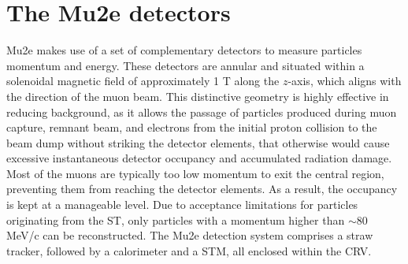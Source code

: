 \section{The Mu2e detectors}
Mu2e makes use of a set of complementary detectors to 
measure particles momentum and energy. These detectors 
are annular and situated within a solenoidal magnetic field of 
approximately 1 T along the $z$-axis, which aligns with 
the direction of the muon beam. This distinctive geometry 
is highly effective in reducing background, as it allows 
the passage of particles produced during muon capture, 
remnant beam, and electrons from the initial proton collision to the beam dump without striking
the detector elements, that otherwise would cause excessive instantaneous detector 
occupancy and accumulated radiation damage. 
Most of the muons are typically too low momentum 
to exit the central region, preventing them from reaching the detector elements. 
As a result, the occupancy is kept at a manageable level. 
Due to acceptance limitations for particles originating from the ST, 
only particles with a momentum higher than $\sim$80 MeV/c can be reconstructed.
The Mu2e detection system comprises a straw tracker, followed by a 
calorimeter and a STM, all enclosed within the CRV.


